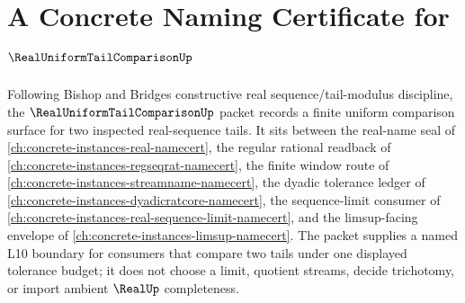 \chapter{A Concrete Naming Certificate for $\RealUniformTailComparisonUp$}
\label{ch:concrete-instances-real-uniform-tail-comparison-namecert}

Following Bishop and Bridges constructive real sequence/tail-modulus discipline, the $\RealUniformTailComparisonUp$ packet records a finite uniform comparison surface for two inspected real-sequence tails. It sits between the real-name seal of \autoref{ch:concrete-instances-real-namecert}, the regular rational readback of \autoref{ch:concrete-instances-regseqrat-namecert}, the finite window route of \autoref{ch:concrete-instances-streamname-namecert}, the dyadic tolerance ledger of \autoref{ch:concrete-instances-dyadicratcore-namecert}, the sequence-limit consumer of \autoref{ch:concrete-instances-real-sequence-limit-namecert}, and the limsup-facing envelope of \autoref{ch:concrete-instances-limsup-namecert}. The packet supplies a named L10 boundary for consumers that compare two tails under one displayed tolerance budget; it does not choose a limit, quotient streams, decide trichotomy, or import ambient $\RealUp$ completeness.

